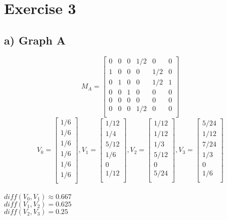\documentclass{article}
\begin{document}
\vspace{2cm}
\section*{Exercise 3}
\subsection*{a) Graph A}
\[
M_A   =
\left[   {\begin{array}{cccccc}
0   &   0   &   0   &  1/2  &   0   &   0   \\
1   &   0   &   0   &   0   &  1/2  &   0   \\
0   &   1   &   0   &   0   &  1/2  &   1   \\
0   &   0   &   1   &   0   &   0   &   0   \\
0   &   0   &   0   &   0   &   0   &   0   \\
0   &   0   &   0   &  1/2  &   0   &   0   \\
\end{array}   }   \right]
\]
\[
V_0   =
\left[   {\begin{array}{c}
1/6\\
1/6\\
1/6\\
1/6\\
1/6\\
1/6\\
\end{array}   }   \right],
V_1   =
\left[   {\begin{array}{c}
1/12\\
1/4\\
5/12\\
1/6\\
0\\
1/12\\
\end{array}   }   \right],
V_2   =
\left[   {\begin{array}{c}
1/12\\
1/12\\
1/3\\
5/12\\
0\\
5/24\\
\end{array}   }   \right],
V_3   =
\left[   {\begin{array}{c}
5/24\\
1/12\\
7/24\\
1/3\\
0\\
1/6\\
\end{array}   }   \right]
\]
\\
$diff(V_0,V_1) \approx 0.667 $\\
$diff(V_1,V_2) = 0.625 $\\
$diff(V_2,V_3) = 0.25 $\\
\end{document}

